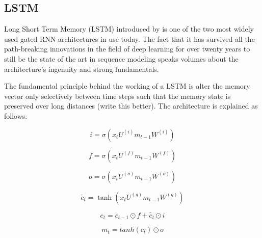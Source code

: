 \subsection{LSTM}
Long Short Term Memory (LSTM) introduced by \cite{LSTM} is one of the two most widely used gated RNN architectures in use today. The fact that it has survived all the path-breaking innovations in the field of deep learning for over twenty years to still be the state of the art in sequence modeling speaks volumes about the architecture's ingenuity and strong fundamentals. 

The fundamental principle behind the working of a LSTM is alter the memory vector only selectively between time steps such that the memory state is preserved over long distances (write this better). The architecture is explained as follows:


\begin{equation}
i= \sigma(x_t U^{(i)} m_{t-1}W^{(i)})
\end{equation}

\begin{equation}
f= \sigma(x_t U^{(f)} m_{t-1}W^{(f)})
\end{equation}

\begin{equation}
o= \sigma(x_t U^{(o)} m_{t-1}W^{(o)})
\end{equation}

\begin{equation}
\widetilde {c_t}= \tanh(x_t U^{(g)} m_{t-1}W^{(g)})
\end{equation}

\begin{equation}
c_t = c_{t-1} \odot f + \widetilde{c_t} \odot i
\end{equation}

\begin{equation}
m_t = tanh(c_t) \odot o
\end{equation}

